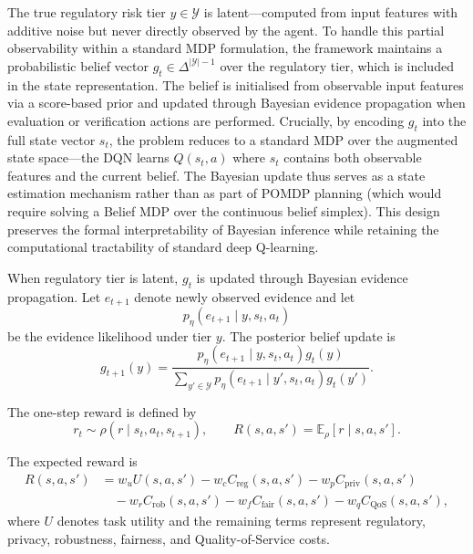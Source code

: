 \documentclass{article}
\begin{document}
The true regulatory risk tier $y \in \mathcal{Y}$ is latent---computed from input features with additive noise but never directly observed by the agent. To handle this partial observability within a standard MDP formulation, the framework maintains a probabilistic belief vector $g_t \in \Delta^{|\mathcal{Y}|-1}$ over the regulatory tier, which is included in the state representation. The belief is initialised from observable input features via a score-based prior and updated through Bayesian evidence propagation when evaluation or verification actions are performed. Crucially, by encoding $g_t$ into the full state vector $s_t$, the problem reduces to a standard MDP over the augmented state space---the DQN learns $Q(s_t, a)$ where $s_t$ contains both observable features and the current belief. The Bayesian update thus serves as a state estimation mechanism rather than as part of POMDP planning (which would require solving a Belief MDP over the continuous belief simplex). This design preserves the formal interpretability of Bayesian inference while retaining the computational tractability of standard deep Q-learning.

When regulatory tier is latent, \(g_t\) is updated through Bayesian evidence propagation. Let \(e_{t+1}\) denote newly observed evidence and let
\begin{equation}
p_{\eta}(e_{t+1}\mid y,s_t,a_t)
\end{equation}
be the evidence likelihood under tier \(y\). The posterior belief update is
\begin{equation}
g_{t+1}(y)
=
\frac{
p_{\eta}(e_{t+1}\mid y,s_t,a_t)g_t(y)
}{
\sum_{y'\in\mathcal{Y}}
p_{\eta}(e_{t+1}\mid y',s_t,a_t)g_t(y')
}.
\end{equation}

The one-step reward is defined by
\begin{equation}
r_t\sim \rho(r\mid s_t,a_t,s_{t+1}),
\qquad
R(s,a,s')=\mathbb{E}_{\rho}[r\mid s,a,s'].
\end{equation}

The expected reward is
\begin{align}
R(s,a,s')
&=
w_u U(s,a,s')
-w_c C_{\mathrm{reg}}(s,a,s')
-w_p C_{\mathrm{priv}}(s,a,s') \nonumber\\
&\quad
-w_r C_{\mathrm{rob}}(s,a,s')
-w_f C_{\mathrm{fair}}(s,a,s')
-w_q C_{\mathrm{QoS}}(s,a,s'),
\end{align}
where \(U\) denotes task utility and the remaining terms represent regulatory, privacy, robustness, fairness, and Quality-of-Service costs.
\end{document}
